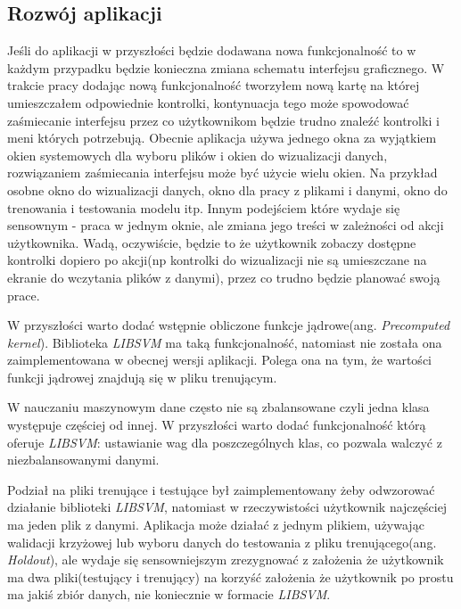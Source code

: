 \documentclass[paper=a4, fontsize=11pt]{scrartcl} %
\numberwithin{equation}{section} %
\numberwithin{figure}{section} %
\begin{document}
\subsection{Rozwój aplikacji}
    \par Jeśli do aplikacji w przyszłości będzie dodawana nowa funkcjonalność to w każdym
    przypadku będzie konieczna zmiana schematu interfejsu graficznego. W trakcie pracy dodając
    nową funkcjonalność tworzyłem nową kartę na której umieszczałem odpowiednie kontrolki,
    kontynuacja tego może spowodować zaśmiecanie interfejsu przez co użytkownikom będzie trudno
    znaleźć kontrolki i meni których potrzebują. Obecnie aplikacja używa jednego okna za
    wyjątkiem okien systemowych dla wyboru plików i okien do wizualizacji danych, rozwiązaniem
    zaśmiecania interfejsu może być użycie wielu okien. Na przykład osobne okno do wizualizacji
    danych, okno dla pracy z plikami i danymi, okno do trenowania i testowania modelu itp. Innym
    podejściem które wydaje się sensownym - praca w jednym oknie, ale zmiana jego treści w
    zależności od akcji użytkownika. Wadą, oczywiście, będzie to że użytkownik zobaczy dostępne
    kontrolki dopiero po akcji(np kontrolki do wizualizacji nie są umieszczane na ekranie do
    wczytania plików z danymi), przez co trudno będzie planować swoją prace. 

    \par W przyszłości warto dodać wstępnie obliczone funkcje jądrowe(ang. \textit{Precomputed
    kernel}). Biblioteka \textit{LIBSVM} ma taką funkcjonalność, natomiast nie została ona
    zaimplementowana w obecnej wersji aplikacji. Polega ona na tym, że wartości funkcji jądrowej
    znajdują się w pliku trenującym.

    \par W nauczaniu maszynowym dane często nie są zbalansowane czyli jedna klasa występuje
    częściej od innej. W przyszłości warto dodać funkcjonalność którą oferuje \textit{LIBSVM}:
    ustawianie wag dla poszczególnych klas, co pozwala walczyć z niezbalansowanymi danymi. 

    \par Podział na pliki trenujące i testujące był zaimplementowany żeby odwzorować działanie
    biblioteki \textit{LIBSVM}, natomiast w rzeczywistości użytkownik najczęściej ma jeden
    plik z danymi. Aplikacja może działać z jednym plikiem, używając walidacji krzyżowej lub
    wyboru danych do testowania z pliku trenującego(ang. \textit{Holdout}), ale wydaje się
    sensowniejszym zrezygnować z założenia że użytkownik ma dwa pliki(testujący i trenujący) na
    korzyść założenia że użytkownik po prostu ma jakiś zbiór danych, nie koniecznie w formacie
    \textit{LIBSVM}.
\end{document}
